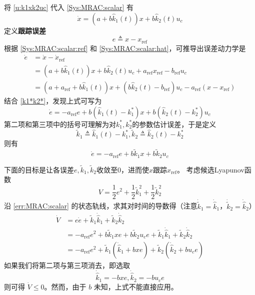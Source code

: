 将 \eqref{u:k1xk2uc} 代入 \eqref{Sys:MRAC:scalar} 有
\begin{equation}
  \dot{x} = (a + b \hat{k}_1 (t)) x + b \hat{k}_2 (t) u_c \label{Sys:MRAC:scalar:hat}
\end{equation}
定义{\bf 跟踪误差}
\begin{equation*}
  e \triangleq x - x_{\ensuremath{\operatorname{ref}}}
\end{equation*}
根据 \eqref{Sys:MRAC:scalar:ref} 和 \eqref{Sys:MRAC:scalar:hat}，可推导出误差动力学是
\begin{align}
  \dot{e} & = \dot{x} - \dot{x}_{\ensuremath{\operatorname{ref}}}
  \nonumber\\
  & = (a + b \hat{k}_1 (t)) x + b \hat{k}_2 (t) u_c +
  a_{\ensuremath{\operatorname{ref}}} x_{\ensuremath{\operatorname{ref}}} -
  b_{\ensuremath{\operatorname{ref}}} u_c \nonumber\\
  & = (a + a_{\ensuremath{\operatorname{ref}}} + b \hat{k}_1 (t)) x + (b
  \hat{k}_2 (t) - b_{\ensuremath{\operatorname{ref}}}) u_c -
  a_{\ensuremath{\operatorname{ref}}} (x - x_{\ensuremath{\operatorname{ref}}}) \nonumber
\end{align}
结合 \eqref{k1*k2*}，发现上式可写为
\[\dot{e} = - a_{\ensuremath{\operatorname{ref}}} e + b (\hat{k}_1(t)-k^{\ast}_1) x + b (\hat{k}_2 (t) - k^{\ast}_2) u_c\]
第二项和第三项中的括号可理解为对$k^{\ast}_1,k^{\ast}_2$的参数估计误差，于是定义
\[\tilde{k}_1 \triangleq\hat{k}_1 (t) - k^{\ast}_1,\tilde{k}_2 \triangleq \hat{k}_2
(t) - k^{\ast}_2\]则有
\begin{equation}
  \dot{e} = - a_{\ensuremath{\operatorname{ref}}} e + b \tilde{k}_1 x + b 
  \tilde{k}_2 u_c  \label{err:MRAC:scalar}
\end{equation}

下面的目标是让各误差$e,\tilde{k}_1,\tilde{k}_2$收敛至$0$，进而使$x$跟踪$x_\mathrm{ref}$。
考虑候选Lyapunov函数
\begin{equation}
  V = \frac{1}{2} e^2 + \frac{1}{2} \tilde{k}^2_1 + \frac{1}{2} \tilde{k}^2_2\label{not_implement_candidate}
\end{equation}
沿 \eqref{err:MRAC:scalar} 的状态轨线，求其对时间的导数得（注意$\dot{\tilde{k}}_1=\dot{\hat{k}}_1$，$\dot{\tilde{k}}_2=\dot{\hat{k}}_2$）
\begin{align}
  \dot{V} & = e  \dot{e} + \tilde{k} _1 \dot{\hat{k}}_1 + \tilde{k} _2
  \dot{\hat{k}}_2 \nonumber\\
  & = - a_{\ensuremath{\operatorname{ref}}} e^2 + b \tilde{k} _1 x  e + b
  \tilde{k} _2 u_c e + \tilde{k} _1 \dot{\hat{k}}_1 + \tilde{k} _2
  \dot{\hat{k}}_2 \label{not_implement_vdot_mid}\\
  & = - a_{\ensuremath{\operatorname{ref}}} e^2 + \tilde{k} _1
  (\dot{\hat{k}}_1 + b  x  e) + \tilde{k} _2 (\dot{\hat{k}}_2 + b  u_c e) \label{not_implement_vdot}
\end{align}
如果我们将第二项与第三项消去，即选取
\begin{equation*}
  \dot{\hat{k}}_1 = - b  x  e, \dot{\hat{k}}_2 = - b  u_c e
\end{equation*}
则可得 $\dot{V} \leq 0$。然而，由于 $b$ 未知，上式不能直接应用。

